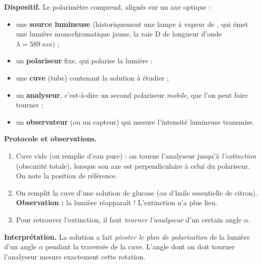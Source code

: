\documentclass[11pt]{article}
\begin{document}
\begin{experience}[Le polarimètre]
\textbf{Dispositif.} Le polarimètre comprend, alignés sur un axe optique :
\begin{itemize}
\item une \textbf{source lumineuse} (historiquement une lampe à vapeur de , qui émet une lumière monochromatique jaune, la raie D de longueur d'onde $\lambda = \SI{589}{nm}$) ;
\item un \textbf{polariseur} fixe, qui polarise la lumière ;
\item une \textbf{cuve} (tube) contenant la solution à étudier ;
\item un \textbf{analyseur}, c'est-à-dire un second polariseur \emph{mobile}, que l'on peut faire tourner ;
\item un \textbf{observateur} (ou un capteur) qui mesure l'intensité lumineuse transmise.
\end{itemize}

\textbf{Protocole et observations.}
\begin{enumerate}
\item Cuve vide (ou remplie d'eau pure) : on tourne l'analyseur jusqu'à \emph{l'extinction} (obscurité totale), lorsque son axe est perpendiculaire à celui du polariseur. On note la position de référence.
\item On remplit la cuve d'une solution de glucose (ou d'huile essentielle de citron). \textbf{Observation :} la lumière réapparaît ! L'extinction n'a plus lieu.
\item Pour retrouver l'extinction, il faut \emph{tourner l'analyseur} d'un certain angle $\alpha$.
\end{enumerate}

\textbf{Interprétation.} La solution a fait \emph{pivoter le plan de polarisation} de la lumière d'un angle $\alpha$ pendant la traversée de la cuve. L'angle dont on doit tourner l'analyseur mesure exactement cette rotation.
\end{experience}
\end{document}
